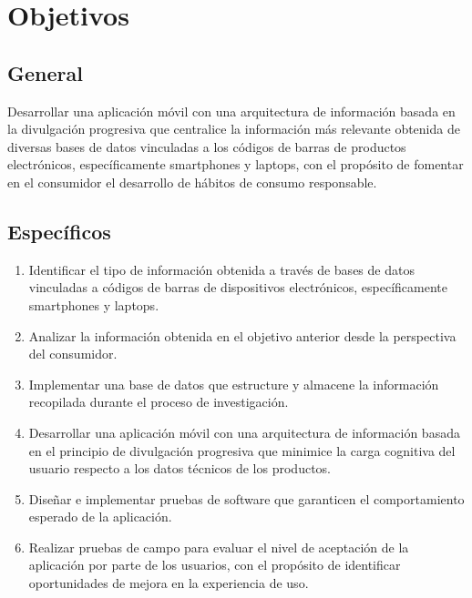 \section{Objetivos}

\subsection{General}

Desarrollar una aplicación móvil con una arquitectura de información
basada en la divulgación progresiva que centralice la información más relevante
obtenida de diversas bases de datos vinculadas a los códigos de barras de
productos electrónicos, específicamente smartphones y laptops, con el propósito
de fomentar en el consumidor el desarrollo de hábitos de consumo responsable. 

\subsection{Específicos}

\begin{enumerate}
    \item Identificar el tipo de información obtenida a través de bases de datos
    vinculadas a códigos de barras de dispositivos electrónicos, específicamente
    smartphones y laptops.
    \item Analizar la información obtenida en el objetivo anterior desde la
    perspectiva del consumidor.
    \item Implementar una base de datos que estructure y almacene la información
    recopilada durante el proceso de investigación.
    \item Desarrollar una aplicación móvil con una arquitectura de información
    basada en el principio de divulgación progresiva que minimice la carga
    cognitiva del usuario respecto a los datos técnicos de los productos.
    \item Diseñar e implementar pruebas de software que garanticen el
    comportamiento esperado de la aplicación.
    \item Realizar pruebas de campo para evaluar el nivel de aceptación de la
    aplicación por parte de los usuarios, con el propósito de identificar
    oportunidades de mejora en la experiencia de uso.
\end{enumerate}

